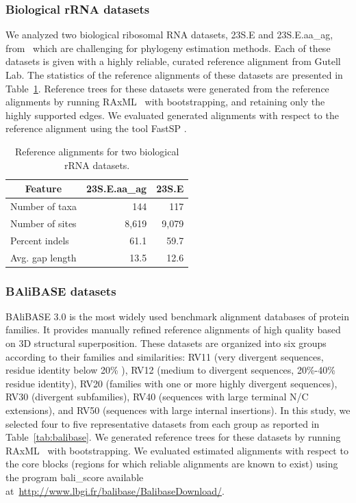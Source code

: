 \subsubsection{Biological rRNA datasets}
We analyzed two biological ribosomal RNA datasets, 23S.E and 23S.E.aa\_ag, from~\citealp{liu2009rapid} which are challenging for phylogeny estimation methods. Each of these datasets is given with a highly reliable, curated reference alignment from Gutell Lab. The statistics of the reference alignments of these datasets are presented in Table~\ref{tab:bio_stat}. Reference trees for these datasets were generated from the reference alignments by running RAxML~\citep{stamatakis2014raxml} with bootstrapping, and retaining only the highly supported edges. We evaluated generated alignments with respect to the reference alignment using the tool FastSP \citep{mirarab2011fastsp}.
\begin{table}[htbp]
	\small
	\centering
	\caption{Reference alignments for two biological rRNA datasets.}
	\begin{tabular}{|l|r|r|}
		\hline
		\multicolumn{1}{|c|}{Feature} & \multicolumn{1}{c|}{23S.E.aa\_ag} & \multicolumn{1}{c|}{23S.E} \\
		\hline
		Number of taxa & 144   & 117 \\
		\hline
		Number of sites & 8,619 & 9,079 \\
		\hline
		Percent indels & 61.1  & 59.7 \\
		\hline
		Avg. gap length & 13.5  & 12.6 \\
		\hline
	\end{tabular}%
	\label{tab:bio_stat}%
\end{table}%

\subsubsection{BAliBASE datasets}
BAliBASE 3.0 \citep{thompson2005balibase} is the most widely used benchmark alignment databases of protein families. It provides manually refined reference alignments of high quality based on 3D structural superposition. These datasets are organized into six groups according to their families and similarities: RV11 (very divergent sequences, residue identity below 20\% ), RV12 (medium to divergent sequences, 20\%-40\% residue identity), RV20 (families with one or more highly divergent sequences), RV30 (divergent subfamilies), RV40 (sequences with large terminal N/C extensions), and RV50 (sequences with large internal insertions). In this study, we selected four to five representative datasets from each group as reported in Table~\ref{tab:balibase}. We generated reference trees for these datasets by running RAxML~\citep{stamatakis2014raxml} with bootstrapping. We evaluated estimated alignments with respect to the core blocks (regions for which reliable alignments are known to exist) using the program bali\_score available at~\url{http://www.lbgi.fr/balibase/BalibaseDownload/}.

